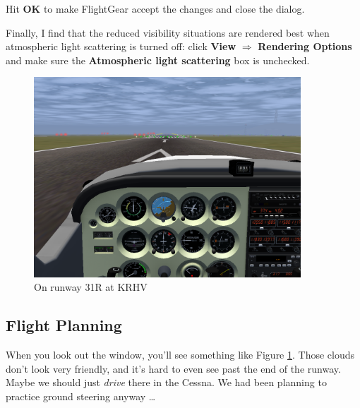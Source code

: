 Hit \textbf{\textsf{OK}} to make FlightGear accept the changes and
close the dialog.  

Finally, I find that the reduced visibility situations are rendered
best when atmospheric light scattering is turned off: click
\textbf{\textsf{View}} $\Rightarrow$ \textbf{\textsf{Rendering
    Options}} and make sure the \textbf{\textsf{Atmospheric light
    scattering}} box is unchecked.





\begin{figure}
  \begin{center}
    \includegraphics[width=10cm]{img/KRHV}
    \caption{On runway 31R at KRHV}
    \label{fig:KRHV}
  \end{center}
\end{figure}

\subsection{Flight Planning}

When you look out the window, you'll see something like Figure
\ref{fig:KRHV}.  Those clouds don't look very friendly, and it's hard
to even see past the end of the runway.  Maybe we should just
\emph{drive} there in the Cessna.  We had been planning to practice
ground steering anyway \ldots{}

